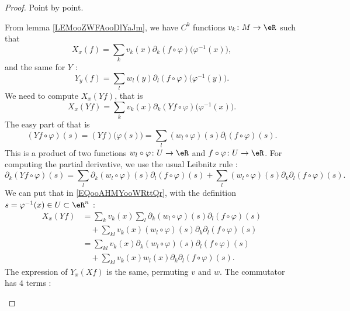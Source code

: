 \begin{proof}
	Point by point.
	\begin{subproof}
		\spitem[\ref{ITEMooZKKUooQjYftU}]
		From lemma \ref{LEMooZWFAooDlYaJm}, we have \( C^k\) functions \( v_k\colon M\to \eR\) such that
		\begin{equation}
			X_x(f)=\sum_kv_k(x)\partial_k(f\circ \varphi)\big( \varphi^{-1}(x) \big),
		\end{equation}
		and the same for \( Y\) :
		\begin{equation}
			Y_y(f)=\sum_lw_l(y)\partial_l(f\circ\varphi)\big( \varphi^{-1}(y) \big).
		\end{equation}
		We need to compute \( X_x(Yf)\), that is
		\begin{equation}        \label{EQooAHMYooWRttQr}
			X_x(Yf)=\sum_kv_k(x)\partial_k(Yf\circ\varphi)\big( \varphi^{-1}(x) \big).
		\end{equation}
		The easy part of that is
		\begin{equation}
			(Yf\circ\varphi)(s)=(Yf)\big( \varphi(s) \big)=\sum_l(w_l\circ\varphi)(s)\partial_l(f\circ \varphi)(s).
		\end{equation}
		This is a product of two functions \( w_l\circ\varphi\colon U\to \eR\) and \( f\circ\varphi\colon U\to \eR\). For computing the partial derivative, we use the usual Leibnitz rule :
		\begin{equation}
			\partial_k(Yf\circ\varphi)(s)=\sum_{l}\partial_k(w_l\circ\varphi)(s)\partial_l(f\circ\varphi)(s)+\sum_l(w_l\circ\varphi)(s)\partial_k\partial_l(f\circ\varphi)(s).
		\end{equation}
		We can put that in \eqref{EQooAHMYooWRttQr}, with the definition \( s=\varphi^{-1}(x)\in U\subset \eR^n\) :
		\begin{subequations}
			\begin{align}
				X_x(Yf) & =\sum_kv_k(x)\sum_l\partial_k(w_l\circ\varphi)(s)\partial_l(f\circ\varphi)(s)    \\
				        & \quad +\sum_{kl}v_k(x)(w_l\circ\varphi)(s)\partial_k\partial_l(f\circ\varphi)(s) \\
				        & =\sum_{kl}v_k(x)\partial_k(w_l\circ\varphi)(s)\partial_l(f\circ\varphi)(s)       \\
				        & \quad+\sum_{kl}v_k(x)w_l(x)\partial_k\partial_l(f\circ\varphi)(s).
			\end{align}
		\end{subequations}
		The expression of \( Y_x(Xf)\) is the same, permuting \( v\) and \( w\). The commutator has \( 4\) terms :

\end{subproof}
\end{proof}
